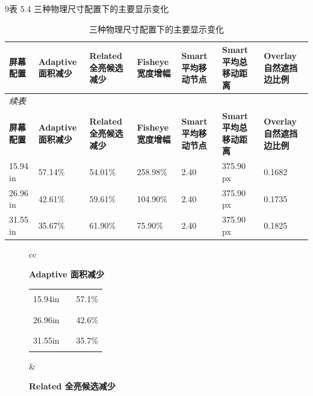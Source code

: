\documentclass[11pt,a4paper,oneside,extrafontsizes]{memoir}
\begin{document}
9表 5.4 三种物理尺寸配置下的主要显示变化

\begin{center}

\begin{longtable}{@{}p{} p{} p{} p{} p{} p{} p{}@{}}
\caption{三种物理尺寸配置下的主要显示变化}\label{tab:screen-size-results}\\
\toprule
\textbf{屏幕配置} & \textbf{Adaptive 面积减少} & \textbf{Related 全亮候选减少} & \textbf{Fisheye 宽度增幅} & \textbf{Smart 平均移动节点} & \textbf{Smart 平均总移动距离} & \textbf{Overlay 自然遮挡边比例} \\
\midrule
\endfirsthead
\multicolumn{7}{l}{\itshape 续表}\\
\toprule
\textbf{屏幕配置} & \textbf{Adaptive 面积减少} & \textbf{Related 全亮候选减少} & \textbf{Fisheye 宽度增幅} & \textbf{Smart 平均移动节点} & \textbf{Smart 平均总移动距离} & \textbf{Overlay 自然遮挡边比例} \\
\midrule
\endhead
15.94 in & 57.14\% & 54.01\% & 258.98\% & 2.40 & 375.90 px & 0.1682 \\
26.96 in & 42.61\% & 59.61\% & 104.90\% & 2.40 & 375.90 px & 0.1735 \\
31.55 in & 35.67\% & 61.90\% & 75.90\% & 2.40 & 375.90 px & 0.1825 \\
\bottomrule
\end{longtable}

\begin{figure}[htbp]
\centering

\begin{tabular}{cc}
\begin{minipage}[t]{0.46\textwidth}
\centering
\textbf{Adaptive 面积减少}\\[-0.2em]

\begin{tabular}{@{}r l r@{}}
15.94in & \textcolor{blue!70!black}{\rule{0.2000\textwidth}{1.1ex}} & 57.1\% \\
26.96in & \textcolor{blue!70!black}{\rule{0.1491\textwidth}{1.1ex}} & 42.6\% \\
31.55in & \textcolor{blue!70!black}{\rule{0.1249\textwidth}{1.1ex}} & 35.7\% \\
\end{tabular}
\end{minipage}
&
\begin{minipage}[t]{0.46\textwidth}
\centering
\textbf{Related 全亮候选减少}\\[-0.2em]


\end{minipage}
\end{tabular}
\end{figure}
\end{center}
\end{document}

